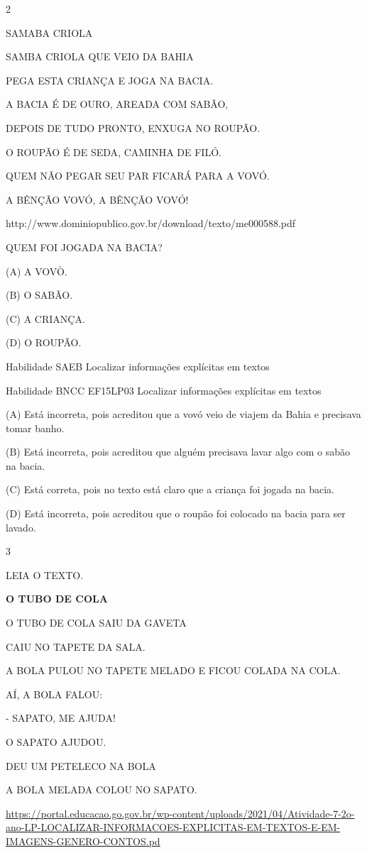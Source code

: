 {{{\num{2}

SAMABA CRIOLA

SAMBA CRIOLA QUE VEIO DA BAHIA

PEGA ESTA CRIANÇA E JOGA NA BACIA.

A BACIA É DE OURO, AREADA COM SABÃO,

DEPOIS DE TUDO PRONTO, ENXUGA NO ROUPÃO.

O ROUPÃO É DE SEDA, CAMINHA DE FILÓ.

QUEM NÃO PEGAR SEU PAR FICARÁ PARA A VOVÓ.

A BÊNÇÃO VOVÓ, A BÊNÇÃO VOVÓ!

http://www.dominiopublico.gov.br/download/texto/me000588.pdf

QUEM FOI JOGADA NA BACIA?

(A) A VOVÒ.

(B) O SABÃO.

(C) A CRIANÇA.

(D) O ROUPÃO.

Habilidade SAEB Localizar informações explícitas em textos

Habilidade BNCC EF15LP03 Localizar informações explícitas em textos

(A) Está incorreta, pois acreditou que a vovó veio de viajem da Bahia e
precisava tomar banho.

(B) Está incorreta, pois acreditou que alguém precisava lavar algo com o
sabão na bacia.

(C) Está correta, pois no texto está claro que a criança foi jogada na
bacia.

(D) Está incorreta, pois acreditou que o roupão foi colocado na bacia
para ser lavado.

\num{3}

LEIA O TEXTO.

\textbf{O TUBO DE COLA}

O TUBO DE COLA SAIU DA GAVETA

CAIU NO TAPETE DA SALA.

A BOLA PULOU NO TAPETE MELADO E FICOU COLADA NA COLA.

AÍ, A BOLA FALOU:

- SAPATO, ME AJUDA!

O SAPATO AJUDOU.

DEU UM PETELECO NA BOLA

A BOLA MELADA COLOU NO SAPATO.

\url{https://portal.educacao.go.gov.br/wp-content/uploads/2021/04/Atividade-7-2o-ano-LP-LOCALIZAR-INFORMACOES-EXPLICITAS-EM-TEXTOS-E-EM-IMAGENS-GENERO-CONTOS.pd}

}}}
